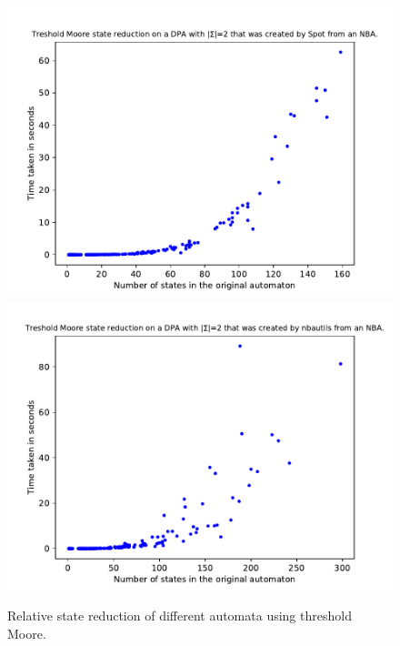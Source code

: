 \begin{figure}
\begin{minipage}{0.49\textwidth}
		\includegraphics[page=2,height=.3\textheight]{../data/analysis/threshold_moore/detspot_ap1.pdf} 
		\includegraphics[page=2,height=.3\textheight]{../data/analysis/threshold_moore/detnbaut_ap1.pdf} 
		\caption{Relative state reduction of different automata using threshold Moore.}
		\label{exp:fig:threshold_moore_reduct_abs}
	\end{minipage}
\end{figure}


